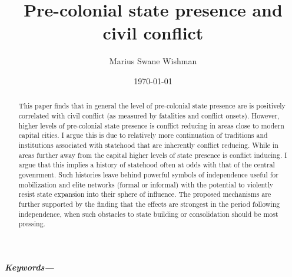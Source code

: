 \documentclass[12pt]{article}
\title{Pre-colonial state presence and civil conflict}
\author[1]{Marius Swane Wishman}
\affil[1]{Department of Sociology and Political Science, NTNU}
\date{\today}
\providecommand{\keywords}[1]
{
	\small	
	\textbf{\textit{Keywords---}} #1
}
\begin{document}
\maketitle

\begin{abstract}

This paper finds that in general the level of pre-colonial state presence are is
positively correlated with civil conflict (as measured by fatalities and
conflict onsets). However, higher levels of pre-colonial state presence is
conflict reducing in areas close to modern capital cities. I argue this is due
to relatively more continuation of traditions and institutions associated with
statehood that are inherently conflict reducing. While in areas further away
from the capital higher levels of state presence is conflict inducing. I argue
that this implies a history of statehood often at odds with that of the central
govenrment. Such histories leave behind powerful symbols of independence useful
for mobilization and elite networks (formal or informal) with the potential to
violently resist state expansion into their sphere of influence. The proposed
mechanisms are further supported by the finding that the effects are strongest
in the period following independence, when such obstacles to state building or
consolidation should be most pressing.

\end{abstract}

\keywords{}


\onehalfspacing
\end{document}

